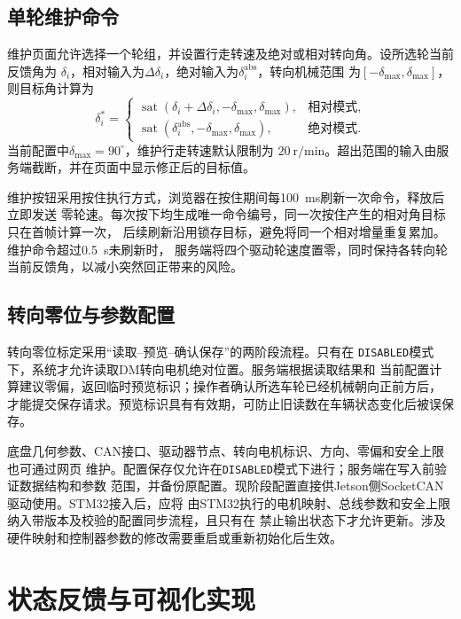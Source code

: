 \documentclass[UTF8,12pt,a4paper,openany]{ctexbook}
\begin{document}
\subsection{单轮维护命令}

维护页面允许选择一个轮组，并设置行走转速及绝对或相对转向角。设所选轮当前反馈角为
$\delta_i$，相对输入为$\Delta\delta_i$，绝对输入为$\delta_i^{\mathrm{abs}}$，转向机械范围
为$[-\delta_{\max},\delta_{\max}]$，则目标角计算为
\begin{equation}
    \delta_i^{*}=
    \begin{cases}
        \operatorname{sat}(\delta_i+\Delta\delta_i,
        -\delta_{\max},\delta_{\max}), & \text{相对模式},\\
        \operatorname{sat}(\delta_i^{\mathrm{abs}},
        -\delta_{\max},\delta_{\max}), & \text{绝对模式}.
    \end{cases}
    \label{eq:web-maintenance-angle}
\end{equation}
当前配置中$\delta_{\max}=90^{\circ}$，维护行走转速默认限制为
$20~\mathrm{r/min}$。超出范围的输入由服务端截断，并在页面中显示修正后的目标值。

维护按钮采用按住执行方式，浏览器在按住期间每100~ms刷新一次命令，释放后立即发送
零轮速。每次按下均生成唯一命令编号，同一次按住产生的相对角目标只在首帧计算一次，
后续刷新沿用锁存目标，避免将同一个相对增量重复累加。维护命令超过0.5~s未刷新时，
服务端将四个驱动轮速度置零，同时保持各转向轮当前反馈角，以减小突然回正带来的风险。

\subsection{转向零位与参数配置}

转向零位标定采用“读取--预览--确认保存”的两阶段流程。只有在
\texttt{DISABLED}模式下，系统才允许读取DM转向电机绝对位置。服务端根据读取结果和
当前配置计算建议零偏，返回临时预览标识；操作者确认所选车轮已经机械朝向正前方后，
才能提交保存请求。预览标识具有有效期，可防止旧读数在车辆状态变化后被误保存。

底盘几何参数、CAN接口、驱动器节点、转向电机标识、方向、零偏和安全上限也可通过网页
维护。配置保存仅允许在\texttt{DISABLED}模式下进行；服务端在写入前验证数据结构和参数
范围，并备份原配置。现阶段配置直接供Jetson侧SocketCAN驱动使用。STM32接入后，应将
由STM32执行的电机映射、总线参数和安全上限纳入带版本及校验的配置同步流程，且只有在
禁止输出状态下才允许更新。涉及硬件映射和控制器参数的修改需要重启或重新初始化后生效。

\section{状态反馈与可视化实现}
\end{document}
